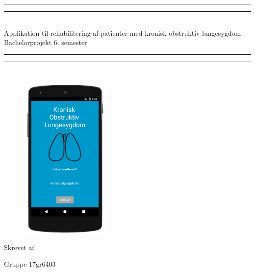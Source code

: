 \begin{center}
\vspace*{\baselineskip}
\rule{\textwidth}{1.6pt}\vspace*{-\baselineskip}\vspace*{2pt} %
\rule{\textwidth}{0.4pt}\\[\baselineskip] %

{\huge Applikation til rehabilitering af  patienter med kronisk obstruktiv lungesygdom\\[0.4\baselineskip] \LARGE Bachelorprojekt 6. semester}\\[0.2\baselineskip] %

\rule{\textwidth}{0.4pt}\vspace*{-\baselineskip}\vspace{3.2pt} %
\rule{\textwidth}{1.6pt}\\[\baselineskip] %
\vspace*{1\baselineskip}




\begin{figure} [H]
\centering
\includegraphics[width=0.4\textwidth]{figures/test/KOLKOLforside}
\label{fig:aktivitetsdiagram}
\end{figure}
Skrevet af \\
{\Large Gruppe 17gr6403\par}
\end{center} %

